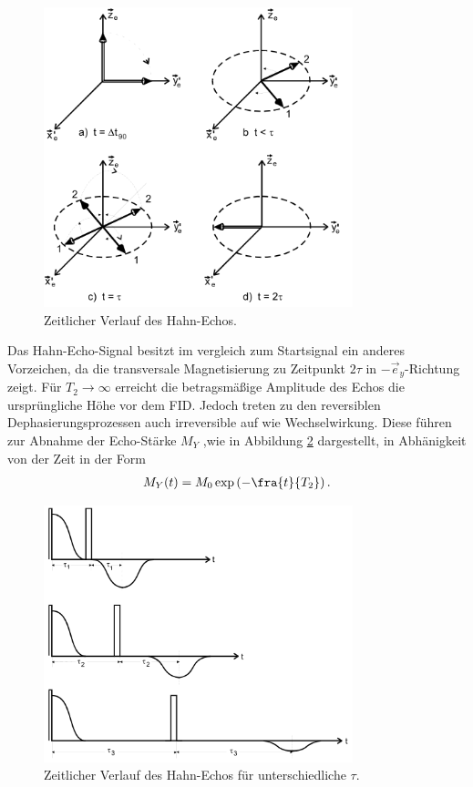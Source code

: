 \begin{itemize}
\begin{figure}
  \includegraphics[width=0.8\textwidth]{spin-echo.PNG}
  \caption{Zeitlicher Verlauf des Hahn-Echos.}
  \label{fig:spin-echo}
\end{figure}

Das Hahn-Echo-Signal besitzt im vergleich zum Startsignal
ein anderes Vorzeichen, da die transversale
Magnetisierung zu Zeitpunkt $2\tau$ in $-\vec{e}_y$-Richtung zeigt.
Für $T_2\rightarrow\infty$ erreicht die betragsmäßige
Amplitude des Echos die
ursprüngliche Höhe vor dem FID.
Jedoch treten zu den reversiblen Dephasierungsprozessen auch
irreversible auf wie Wechselwirkung. Diese führen zur Abnahme der Echo-Stärke $M_Y$
,wie in Abbildung \ref{fig:tau_ver} dargestellt,
in Abhänigkeit von der Zeit in der Form
\begin{align}
  M_Y(t)=M_0 \exp\left(-\fra{t}{T_2}\right).
\end{align}

\begin{figure}
  \includegraphics[width=0.8\textwidth]{tau_ver.PNG}
  \caption{Zeitlicher Verlauf des Hahn-Echos für unterschiedliche $\tau$.}
  \label{fig:tau_ver}
\end{figure}





\end{itemize}
